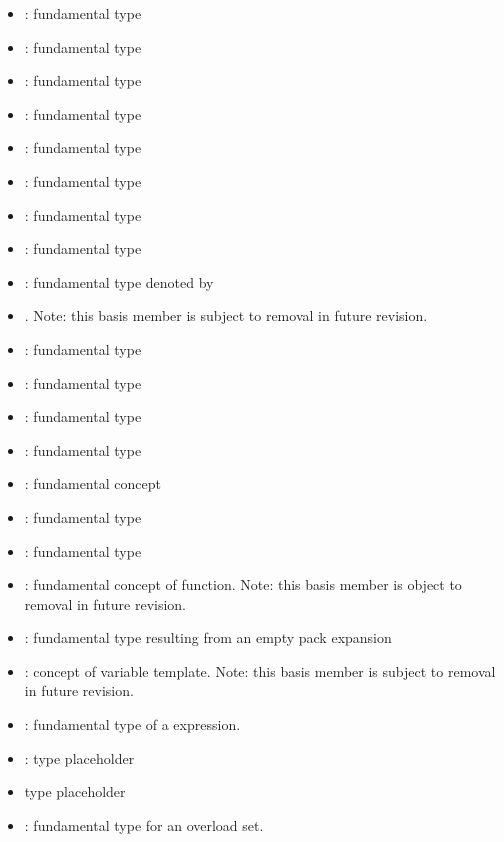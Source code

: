 \begin{itemize}
  \item {}: fundamental type 
  \item {}: fundamental type 
  \item {}: fundamental type 
  \item {}: fundamental type 
  \item {}: fundamental type 
  \item {}: fundamental type 
  \item {}: fundamental type 
  \item {}: fundamental type 
  \item {}: fundamental type denoted by 
  \item {}.  Note: this basis member is subject to removal in future revision.
  \item {}: fundamental type 
  \item {}: fundamental type 
  \item {}: fundamental type 
  \item {}: fundamental type 
  \item {}: fundamental concept 
  \item {}: fundamental type 
  \item {}: fundamental type 
  \item {}: fundamental concept of function.  Note: this basis member is object to removal in future revision.
  \item {}: fundamental type resulting from an empty pack expansion
  \item {}: concept of variable template.  Note: this basis member is subject to removal in future revision.
  \item {}: fundamental type of a  expression.
  \item {}: type placeholder 
  \item {} type placeholder 
  \item {}:  fundamental type for an overload set.
\end{itemize}

